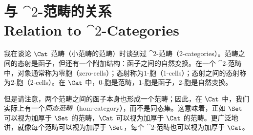 \section{与 $\cat{2}$-范畴的关系\\ \textmd{Relation to $\cat{2}$-Categories}}

我在谈论 $\Cat$ 范畴（小范畴的范畴）时谈到过 $\cat{2}$-范畴（2-categories）。范畴之间的态射是函子，但还有一个附加结构：函子之间的自然变换。在一个 $\cat{2}$-范畴中，对象通常称为零胞（zero-cells）；态射称为$1$-胞（1-cells）；态射之间的态射称为$2$-胞（2-cells）。在 $\Cat$ 中，$0$-胞是范畴，$1$-胞是函子，$2$-胞是自然变换。

但是请注意，两个范畴之间的函子本身也形成一个范畴；因此，在 $\Cat$ 中，我们实际上有一个\emph{同态范畴}（hom-category），而不是同态集。这意味着，正如 $\Set$ 可以视为加厚于 $\Set$ 的范畴，$\Cat$ 可以视为加厚于 $\Cat$ 的范畴。更广泛地讲，就像每个范畴可以视为加厚于 $\Set$，每个 $\cat{2}$-范畴也可以视为加厚于 $\Cat$。
